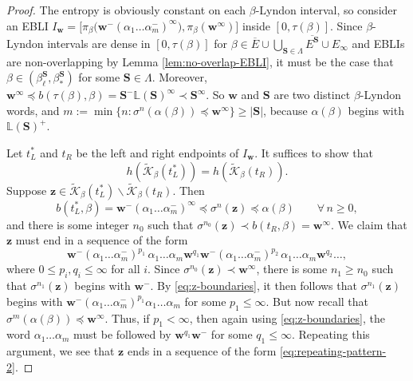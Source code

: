 \documentclass[11pt]{amsart}
\theoremstyle{definition}
\theoremstyle{remark}
\numberwithin{equation}{section}
\renewcommand{\L}{\ensuremath{\mathbb{L}}}
\newcommand{\Kt}{\widetilde{\mathcal{K}}}
\newcommand{\cs}{ {\mathbf{S}}}
\newcommand{\w}{\mathbf{w}}
\newcommand{\z}{\mathbf{z}}
\newcommand{\f}{\infty}
\newcommand{\al}{\alpha}
\newcommand{\lle}{\preccurlyeq}
\newcommand{\si}{\sigma}
\newcommand{\La}{\Lambda}
\begin{document}
\begin{proof}
The entropy is obviously constant on each $\beta$-Lyndon interval, so consider an EBLI $I_\w=\big[\pi_\beta\big(\w^-(\al_1\dots\al_m^-)^\f\big),\pi_\beta(\w^\f)\big]$ inside $[0,\tau(\beta)]$. Since $\beta$-Lyndon intervals are dense in $[0,\tau(\beta)]$ for $\beta\in \overline{E}\cup \bigcup_{\cs\in\La}\overline{E^\cs}\cup E_\f$ and EBLIs are non-overlapping by Lemma \ref{lem:no-overlap-EBLI}, it must be the case that $\beta\in(\beta_\ell^\cs,\beta_*^\cs)$ for some $\cs\in\La$. Moreover, $\w^\f\lle b(\tau(\beta),\beta)=\cs^-\L(\cs)^\f \prec \cs^\f$. So $\w$ and $\cs$ are two distinct $\beta$-Lyndon words, and $m:=\min\{n:\si^n(\al(\beta))\lle\w^\f\}\geq |\cs|$, because $\al(\beta)$ begins with $\L(\cs)^+$.

Let $t_L^*$ and $t_R$ be the left and right endpoints of $I_\w$. It suffices to show that
\[
h(\Kt_\beta(t_L^*))=h(\Kt_\beta(t_R)).
\]
Suppose $\z\in \Kt_\beta(t_L^*)\backslash \Kt_\beta(t_R)$. Then
\begin{equation} \label{eq:z-boundaries}
b(t_L^*,\beta)=\w^-(\al_1\dots\al_m^-)^\f\lle \si^n(\z) \lle \al(\beta) \qquad\forall\,n\geq 0,
\end{equation}
and there is some integer $n_0$ such that $\si^{n_0}(\z)\prec b(t_R,\beta)=\w^\f$. We claim that $\z$ must end in a sequence of the form
\begin{equation} \label{eq:repeating-pattern-2}
\w^-(\al_1\dots\al_m^-)^{p_1}\,\al_1\dots\al_m \w^{q_1}\w^-(\al_1\dots\al_m^-)^{p_2}\,\al_1\dots\al_m \w^{q_2}\dots,
\end{equation}
where $0\leq p_i,q_i\leq\infty$ for all $i$. Since $\si^{n_0}(\z)\prec \w^\f$, there is some $n_1\geq n_0$ such that $\si^{n_1}(\z)$ begins with $\w^-$. By \eqref{eq:z-boundaries}, it then follows that $\si^{n_1}(\z)$ begins with $\w^-(\al_1\dots\al_m^-)^{p_1}\al_1\dots\al_m$ for some $p_1\leq\infty$. But now recall that $\si^m(\al(\beta))\lle \w^\f$. Thus, if $p_1<\infty$, then again using \eqref{eq:z-boundaries}, the word $\al_1\dots\al_m$ must be followed by $\w^{q_1}\w^-$ for some $q_1\leq\infty$. Repeating this argument, we see that $\z$ ends in a sequence of the form \eqref{eq:repeating-pattern-2}.


\end{proof}
\end{document}
